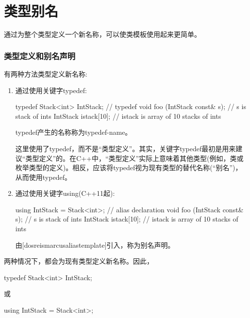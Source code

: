 \section{类型别名}

通过为整个类型定义一个新名称，可以使类模板使用起来更简单。

\subsubsection{类型定义和别名声明}

有两种方法类型定义新名称:

\begin{enumerate}
\item
通过使用关键字typedef:

\begin{cpp}
typedef Stack<int> IntStack; // typedef
void foo (IntStack const& s); // s is stack of ints
IntStack istack[10]; // istack is array of 10 stacks of ints
\end{cpp}

typedef产生的名称称为typedef-name。

\begin{notice}
这里使用了typedef，而不是“类型定义”。其实，关键字typedef最初是用来建议“类型定义”的。在C++中，“类型定义”实际上意味着其他类型(例如，类或枚举类型的定义)。相反，应该将typedef视为现有类型的替代名称(“别名”)，从而使用typedef。
\end{notice}

\item
通过使用关键字using(C++11起):

\begin{cpp}
using IntStack = Stack<int>; // alias declaration
void foo (IntStack const& s); // s is stack of ints
IntStack istack[10]; // istack is array of 10 stacks of ints
\end{cpp}

由[dosreismarcusaliastemplate]引入，称为别名声明。

\end{enumerate}

两种情况下，都会为现有类型定义新名称。因此，

\begin{cpp}
typedef Stack<int> IntStack;
\end{cpp}

或

\begin{cpp}
using IntStack = Stack<int>;
\end{cpp}

